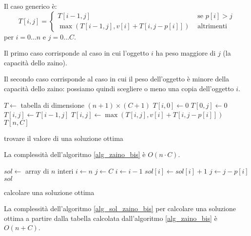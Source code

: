 Il caso generico \`e:
\[
T[i,j] = 
\begin{cases}
T[i-1,j] & \text{ se } p[i] > j \\
\max \left( T[i-1,j], v[i] + T \left[ i, j-p[i] \right] \right) & \text{ altrimenti}
\end{cases}
\]
per $i = 0 \ldots n$ e $j = 0 \ldots C$.

Il primo caso corrisponde al caso in cui l'oggetto $i$ ha peso maggiore di $j$ (la capacit\`a dello zaino). 

Il secondo caso corrisponde al caso in cui il peso dell'oggetto \`e minore della capacit\`a dello zaino: possiamo quindi scegliere o meno una copia dell'oggetto $i$.

\begin{algorithm}
\begin{algorithmic}
    \State $T \gets$ tabella di dimensione $(n+1) \times (C+1)$
        \State $T[i,0] \gets 0$
    \EndFor
        \State $T[0,j] \gets 0$
    \EndFor
            \State $T[i,j] \gets T[i-1,j]$
                \State $T[i,j] \gets \max \left( T[i,j], v[i] + T \left[ i, j-p[i] \right] \right)$
            \EndIf
        \EndFor
    \EndFor
    \State \Return $T[n,C]$
\EndFunction
\end{algorithmic}
\caption{\label{alg_zaino_bis}trovare il valore di una soluzione ottima}
\end{algorithm}

La complessit\`a dell'algoritmo \ref{alg_zaino_bis} \`e $O(n \cdot C)$.

\begin{algorithm}
\begin{algorithmic}
    \State $sol \gets$ array di $n$ interi
    \State $i \gets n$
    \State $j \gets C$
            \State $i \gets i - 1$
        \Else
            \State $sol[i] \gets sol[i] + 1$
            \State $j \gets j - p[i]$
        \EndIf
    \EndWhile
    \State \Return $sol$
\EndFunction
\end{algorithmic}
\caption{\label{alg_sol_zaino_bis}calcolare una soluzione ottima}
\end{algorithm}

La complessit\`a dell'algoritmo \ref{alg_sol_zaino_bis} per calcolare una soluzione ottima a partire dalla tabella calcolata dall'algoritmo \ref{alg_zaino_bis} \`e $O(n + C)$.

